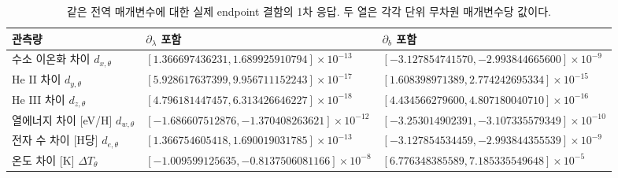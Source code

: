 \begin{table}[htbp]\centering\scriptsize
\caption{같은 전역 매개변수에 대한 실제 endpoint 결함의 1차 응답. 두 열은 각각 단위 무차원 매개변수당 값이다.}\label{tab:responses}
\setlength{\tabcolsep}{3pt}\begin{tabular}{lll}\toprule
관측량 & $\partial_\lambda$ 포함 & $\partial_b$ 포함\\\midrule
수소 이온화 차이 $d_{x,\theta}$ & $[1.366697436231,1.689925910794]\times10^{-13}$ & $[-3.127854741570,-2.993844665600]\times10^{-9}$\\
He II 차이 $d_{y,\theta}$ & $[5.928617637399,9.956711152243]\times10^{-17}$ & $[1.608398971389,2.774242695334]\times10^{-15}$\\
He III 차이 $d_{z,\theta}$ & $[4.796181447457,6.313426646227]\times10^{-18}$ & $[4.434566279600,4.807180040710]\times10^{-16}$\\
열에너지 차이 [eV/H] $d_{w,\theta}$ & $[-1.686607512876,-1.370408263621]\times10^{-12}$ & $[-3.253014902391,-3.107335579349]\times10^{-10}$\\
전자 수 차이 [H당] $d_{e,\theta}$ & $[1.366754605418,1.690019031785]\times10^{-13}$ & $[-3.127854534459,-2.993844355539]\times10^{-9}$\\
온도 차이 [K] $\Delta T_\theta$ & $[-1.009599125635,-0.8137506081166]\times10^{-8}$ & $[6.776348385589,7.185335549648]\times10^{-5}$\\
\bottomrule\end{tabular}\end{table}
